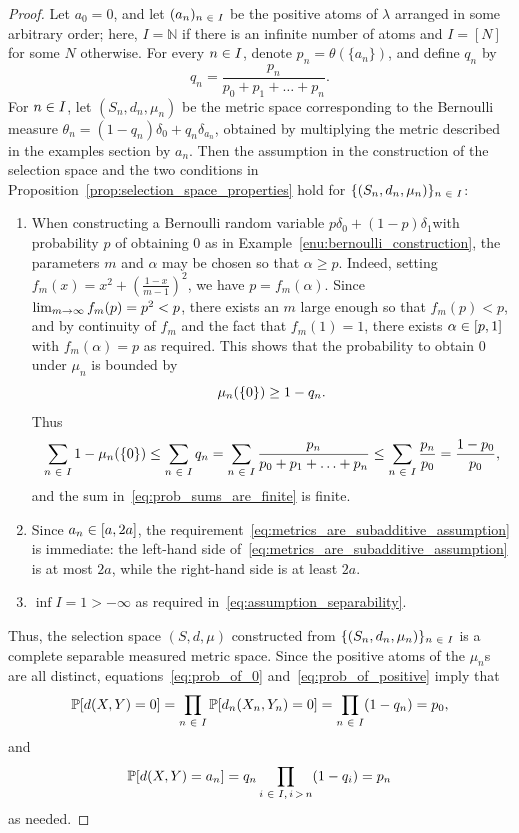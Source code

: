 \documentclass[10pt]{amsart}
\theoremstyle{definition}\newtheorem{defi}[theo]{Definition}\newtheorem{rema}[theo]{Remark}\newtheorem{exam}[theo]{Example}\newtheorem{exem}[theo]{Example}\newtheorem{nota}[theo]{Notation}
\newcommand*\n{\mathbb{N}}
\newcommand*\p{\mathbb{P}}
\let\originalleft\left
\let\originalright\right
\renewcommand{\left}{\mathopen{}\mathclose\bgroup\originalleft}
\renewcommand{\right}{\aftergroup\egroup\originalright}
\renewcommand*{\to}{\mathchoice{\longrightarrow}{\rightarrow}{\rightarrow}{\rightarrow}}
\let\oldin\in
\renewcommand{\in}{\mathchoice{\oldin}{\oldin}{\,\oldin\,}{\,\oldin\,}}
\begin{document}
\begin{proof}
Let $a_{0}=0$, and let $(a_{n})_{n\in I}$ be the positive atoms of $\lambda$ arranged in some arbitrary order; here, $I=\n$ if there is an infinite number of atoms and $I=[N]$ for some $N$ otherwise. For every $n\in I$, denote $p_{n}=\theta(\{ a_{n}\})$, and define $q_{n}$ by
\[
q_{n}=\frac{p_{n}}{p_{0}+p_{1}+\ldots+p_{n}}.
\]
For $n\in I$, let $(S_{n},d_{n},\mu_{n})$ be the metric space corresponding to the Bernoulli measure $\theta_{n}=(1-q_{n})\delta_{0}+q_{n}\delta_{a_{n}}$, obtained by multiplying the metric described in the examples section by $a_{n}$. Then the assumption in the construction of the selection space and the two conditions in Proposition~\ref{prop:selection_space_properties} hold for $\{ (S_{n},d_{n},\mu_{n})\} _{n\in I}$:
\begin{enumerate}
\item When constructing a Bernoulli random variable $p\delta_{0}+(1-p)\delta_{1}$with probability $p$ of obtaining $0$ as in Example~\ref{enu:bernoulli_construction}, the parameters $m$ and $\alpha$ may be chosen so that $\alpha\geq p$. Indeed, setting $f_{m}(x)=x^{2}+(\frac{1-x}{m-1})^{2}$, we have $p=f_{m}(\alpha)$. Since $\lim_{m\to\infty}f_{m}(p)=p^{2}<p$, there exists an $m$ large enough so that $f_{m}(p)<p$, and by continuity of $f_{m}$ and the fact that $f_{m}(1)=1$, there exists $\alpha\in[p,1]$ with $f_{m}(\alpha)=p$ as required. This shows that the probability to obtain $0$ under $\mu_{n}$ is bounded by
\begin{equation}\label{eq:bound_on_q}
\mu_{n}\left(\left\{ 0\right\} \right)\geq1-q_{n}.
\end{equation}
Thus
\begin{equation}\label{eq:sum_of_q_is_finite}
\sum_{n\in I}1-\mu_{n}\left(\left\{ 0\right\} \right)\leq\sum_{n\in I}q_{n}=\sum_{n\in I}\frac{p_{n}}{p_{0}+p_{1}+\ldots+p_{n}}\leq\sum_{n\in I}\frac{p_{n}}{p_{0}}=\frac{1-p_{0}}{p_{0}},
\end{equation}
and the sum in~\eqref{eq:prob_sums_are_finite} is finite.
\item Since $a_{n}\in[a,2a]$, the requirement~\eqref{eq:metrics_are_subadditive_assumption} is immediate: the left-hand side of~\eqref{eq:metrics_are_subadditive_assumption} is at most $2a$, while the right-hand side is at least $2a$.
\item $\inf I=1>-\infty$ as required in~\eqref{eq:assumption_separability}.
\end{enumerate}
Thus, the selection space $(S,d,\mu)$ constructed from $\{(S_{n},d_{n},\mu_{n})\} _{n\in I}$ is a complete separable measured metric space. Since the positive atoms of the $\mu_{n}$s are all distinct, equations~\eqref{eq:prob_of_0} and~\eqref{eq:prob_of_positive} imply that
\begin{equation}\label{eq:single_prob_zero}
\p\left[d\left(X,Y\right)=0\right]=\prod_{n\in I}\p\left[d_{n}\left(X_{n},Y_{n}\right)=0\right]=\prod_{n\in I}\left(1-q_{n}\right)=p_{0},
\end{equation}
and
\[
\p\left[d\left(X,Y\right)=a_{n}\right]=q_{n}\prod_{i\in I,\,i\,>\,n}\left(1-q_{i}\right)=p_{n}
\]
as needed.


\end{proof}
\end{document}
